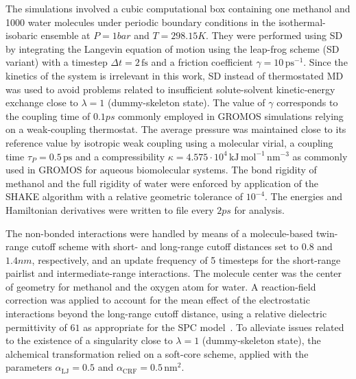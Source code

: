 The simulations involved a cubic computational box containing one methanol
and 1000 water molecules under periodic boundary conditions
in the isothermal-isobaric ensemble at 
$P=1\unit{bar}$ and $T=298.15\unit{K}$.
%
They were performed using SD 
by integrating the Langevin equation of motion\cite{LA08.6}
using the leap-frog scheme\cite{HO70.1} (SD variant\cite{VA88.1}) with a timestep $\Delta t=2\,\mathrm{fs}$
and a friction coefficient $\gamma=10\,\mathrm{ps^{-1}}$.
%
Since the kinetics of the system is irrelevant in this work, SD instead of thermostated MD was used to 
avoid problems related to insufficient solute-solvent kinetic-energy exchange\cite{SH03.4,SH05.7,MO07.2,LI08.8}
close to $\lambda=1$ (dummy-skeleton state).
The value of $\gamma$ corresponds 
to the  coupling time of $0.1\unit{ps}$
commonly employed in GROMOS simulations\cite{VA96.1,VA11.7} relying on a weak-coupling\cite{BE84.1} thermostat.
%
The average pressure was maintained close to its reference value
by isotropic weak coupling\cite{BE84.1} using a molecular virial, 
a coupling time $\tau_{P}=0.5\,\textrm{ps}$
and a compressibility $\kappa=4.575\cdot10^4\,\mathrm{kJ}\,\mathrm{mol}^{-1}\,\mathrm{nm}^{-3}$
as commonly used in GROMOS for aqueous biomolecular systems\cite{VA96.1,VA11.7}.
%
The bond rigidity  of methanol and the full rigidity of water were enforced by
application of the SHAKE algorithm\cite{RY77.1} with a relative 
geometric tolerance of $10^{-4}$. 
%
The energies and 
Hamiltonian derivatives
were written to file every $2\unit{ps}$ for analysis.
%


The non-bonded interactions were handled by means of a molecule-based
twin-range cutoff scheme\cite{BE86.3}
with short- and long-range cutoff distances set
to $0.8$ and $1.4\unit{nm}$, respectively, and an update frequency of
5 timesteps for the short-range pairlist and intermediate-range
interactions. The molecule center was the center of geometry for methanol and the oxygen atom for water.
A reaction-field correction\cite{BA73.1,TI95.1} was applied to account for the mean effect of the electrostatic interactions beyond the long-range cutoff distance, using a relative
dielectric permittivity of $61$ as appropriate for the SPC model~\cite{HE01.1}.
%
To alleviate issues related to the existence of a singularity\cite{SI93.1,BE94.1,ZA94.1} 
close to $\lambda=1$ (dummy-skeleton state), the alchemical transformation
relied on a soft-core scheme\cite{BE94.1},
applied with the parameters $\alpha_{\mathrm{LJ}}=0.5$ and $\alpha_{\mathrm{CRF}}=0.5\,\mathrm{nm}^2$.
%

